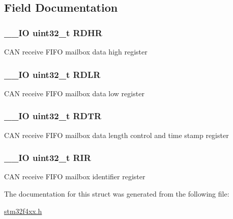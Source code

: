 \subsection{Field Documentation}
\hypertarget{struct_c_a_n___f_i_f_o_mail_box___type_def_a7f11f42ba9d3bc5cd4a4f5ea0214608e}{
\subsubsection[{R\-D\-H\-R}]{\setlength{\rightskip}{0pt plus 5cm}\-\_\-\-\_\-\-I\-O uint32\-\_\-t R\-D\-H\-R}}\label{struct_c_a_n___f_i_f_o_mail_box___type_def_a7f11f42ba9d3bc5cd4a4f5ea0214608e}
C\-A\-N receive F\-I\-F\-O mailbox data high register \hypertarget{struct_c_a_n___f_i_f_o_mail_box___type_def_ae1c569688eedd49219cd505b9c22121b}{
\subsubsection[{R\-D\-L\-R}]{\setlength{\rightskip}{0pt plus 5cm}\-\_\-\-\_\-\-I\-O uint32\-\_\-t R\-D\-L\-R}}\label{struct_c_a_n___f_i_f_o_mail_box___type_def_ae1c569688eedd49219cd505b9c22121b}
C\-A\-N receive F\-I\-F\-O mailbox data low register \hypertarget{struct_c_a_n___f_i_f_o_mail_box___type_def_a9563d8a88d0db403b8357331bea83a2e}{
\subsubsection[{R\-D\-T\-R}]{\setlength{\rightskip}{0pt plus 5cm}\-\_\-\-\_\-\-I\-O uint32\-\_\-t R\-D\-T\-R}}\label{struct_c_a_n___f_i_f_o_mail_box___type_def_a9563d8a88d0db403b8357331bea83a2e}
C\-A\-N receive F\-I\-F\-O mailbox data length control and time stamp register \hypertarget{struct_c_a_n___f_i_f_o_mail_box___type_def_a0acc8eb90b17bef5b9e03c7ddaacfb0b}{
\subsubsection[{R\-I\-R}]{\setlength{\rightskip}{0pt plus 5cm}\-\_\-\-\_\-\-I\-O uint32\-\_\-t R\-I\-R}}\label{struct_c_a_n___f_i_f_o_mail_box___type_def_a0acc8eb90b17bef5b9e03c7ddaacfb0b}
C\-A\-N receive F\-I\-F\-O mailbox identifier register 

The documentation for this struct was generated from the following file\-:\begin{DoxyCompactItemize}
\item 
\hyperlink{stm32f4xx_8h}{stm32f4xx.\-h}\end{DoxyCompactItemize}
